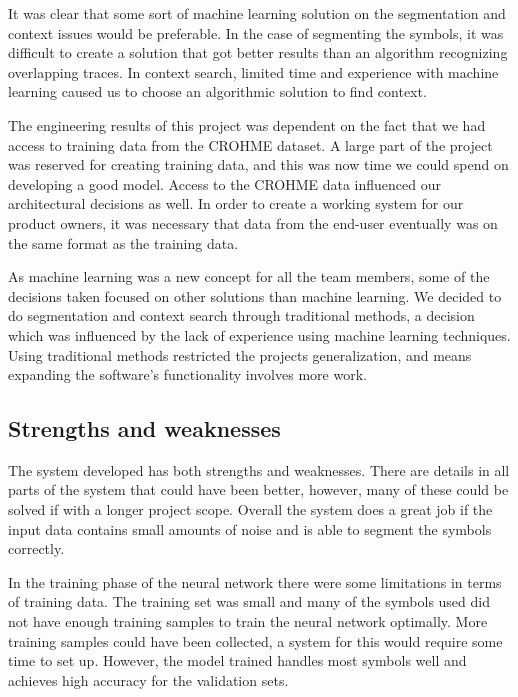 It was clear that some sort of machine learning solution on the segmentation and context issues would be preferable. In the case of segmenting the symbols, it was difficult to create a solution that got better results than an algorithm recognizing overlapping traces. In context search, limited time and experience with machine learning caused us to choose an algorithmic solution to find context.

The engineering results of this project was dependent on the fact that we had access to training data from the CROHME dataset. A large part of the project was reserved for creating training data, and this was now time we could spend on developing a good model. Access to the CROHME data influenced our architectural decisions as well. In order to create a working system for our product owners, it was necessary that data from the end-user eventually was on the same format as the training data.

As machine learning was a new concept for all the team members, some of the decisions taken focused on other solutions than machine learning. We decided to do segmentation and context search through traditional methods, a decision which was influenced by the lack of experience using machine learning techniques. Using traditional methods restricted the projects generalization, and means expanding the software's functionality involves more work.

\subsection{Strengths and weaknesses}

The system developed has both strengths and weaknesses. There are details in all parts of the system that could have been better, however, many of these could be solved if with a longer project scope. Overall the system does a great job if the input data contains small amounts of noise and is able to segment the symbols correctly.

In the training phase of the neural network there were some limitations in terms of training data. The training set was small and many of the symbols used did not have enough training samples to train the neural network optimally. More training samples could have been collected, a system for this would require some time to set up. However, the model trained handles most symbols well and achieves high accuracy for the validation sets.

